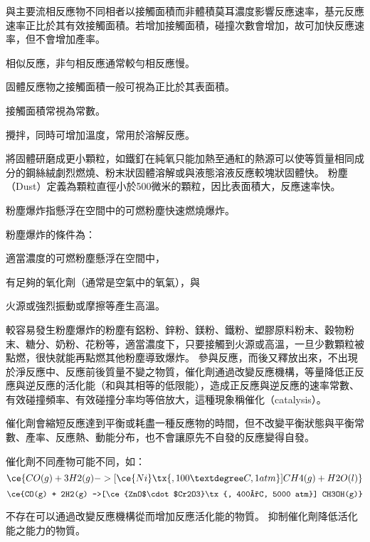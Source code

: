 \documentclass[a4paper,12pt]{report}
\begin{document}
與主要流相反應物不同相者以接觸面積而非體積莫耳濃度影響反應速率，基元反應速率正比於其有效接觸面積。若增加接觸面積，碰撞次數會增加，故可加快反應速率，但不會增加產率。

相似反應，非勻相反應通常較勻相反應慢。

固體反應物之接觸面積一般可視為正比於其表面積。

接觸面積常視為常數。
\bit
\item 攪拌，同時可增加溫度，常用於溶解反應。
\item 將固體研磨成更小顆粒，如鐵釘在純氧只能加熱至通紅的熱源可以使等質量相同成分的鋼絲絨劇烈燃燒、粉末狀固體溶解或與液態溶液反應較塊狀固體快。
\eit
{}
粉塵（Dust）定義為顆粒直徑小於500微米的顆粒，因比表面積大，反應速率快。

粉塵爆炸指懸浮在空間中的可燃粉塵快速燃燒爆炸。

粉塵爆炸的條件為：
\bit
\item 適當濃度的可燃粉塵懸浮在空間中，
\item 有足夠的氧化劑（通常是空氣中的氧氣），與
\item 火源或強烈振動或摩擦等產生高溫。
\eit

較容易發生粉塵爆炸的粉塵有鋁粉、鋅粉、鎂粉、鐵粉、塑膠原料粉末、穀物粉末、糖分、奶粉、花粉等，適當濃度下，只要接觸到火源或高溫，一旦少數顆粒被點燃，很快就能再點燃其他粉塵導致爆炸。
參與反應，而後又釋放出來，不出現於淨反應中、反應前後質量不變之物質，催化劑通過改變反應機構，等量降低正反應與逆反應的活化能（和與其相等的低限能），造成正反應與逆反應的速率常數、有效碰撞頻率、有效碰撞分率均等倍放大，這種現象稱催化（catalysis）。

催化劑會縮短反應達到平衡或耗盡一種反應物的時間，但不改變平衡狀態與平衡常數、產率、反應熱、動能分布，也不會讓原先不自發的反應變得自發。

催化劑不同產物可能不同，如：
\[\ce{CO(g) + 3H2(g) ->[\ce{Ni}\tx{, 100°C, 1 atm}] CH4(g) + H2O(l)}\]
\[\ce{CO(g) + 2H2(g) ->[\ce{ZnO$\cdot$Cr2O3}\tx{, 400°C, 5000 atm}] CH3OH(g)}\]

不存在可以通過改變反應機構從而增加反應活化能的物質。
抑制催化劑降低活化能之能力的物質。
\end{document}

